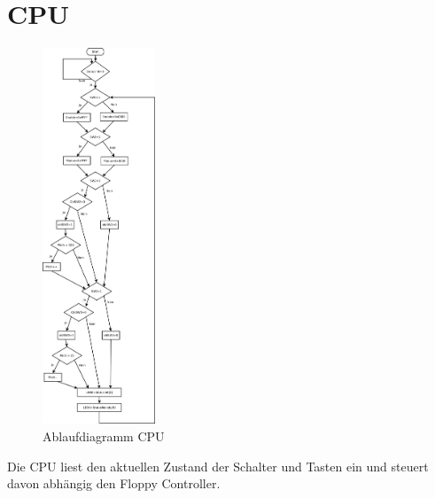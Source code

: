 \section{CPU}
\begin{figure}[h!]
    \centering
    \includegraphics[width=0.3\textwidth]{../organization/Ablaufdiagramm.pdf}
    \caption{Ablaufdiagramm CPU}
    \label{fig:block}
\end{figure}
\noindent Die CPU liest den aktuellen Zustand der Schalter und Tasten ein und steuert 
davon abhängig den Floppy Controller. 
